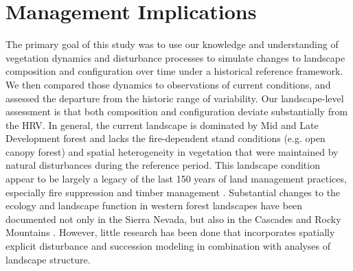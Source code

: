 \clearpage
\section{Management Implications}

The primary goal of this study was to use our knowledge and understanding of vegetation dynamics and disturbance processes to simulate changes to landscape composition and configuration over time under a historical reference framework. We then compared those dynamics to observations of current conditions, and assessed the departure from the historic range of variability. Our landscape-level assessment is that both composition and configuration deviate substantially from the HRV. In general, the current landscape is dominated by Mid and Late Development forest and lacks the fire-dependent stand conditions (e.g. open canopy forest) and spatial heterogeneity in vegetation that were maintained by natural disturbances during the reference period. This landscape condition appear to be largely a legacy of the last 150 years of land management practices, especially fire suppression and timber management \citep{Safford2014,Stephens2007}. Substantial changes to the ecology and landscape function in western forest landscapes have been documented not only in the Sierra Nevada, but also in the Cascades and Rocky Mountains \citep{Hessburg2005,Baker2012,Baker2014,Mallek2013,Agee1993} . However, little research has been done that incorporates spatially explicit disturbance and succession modeling in combination with analyses of landscape structure.

